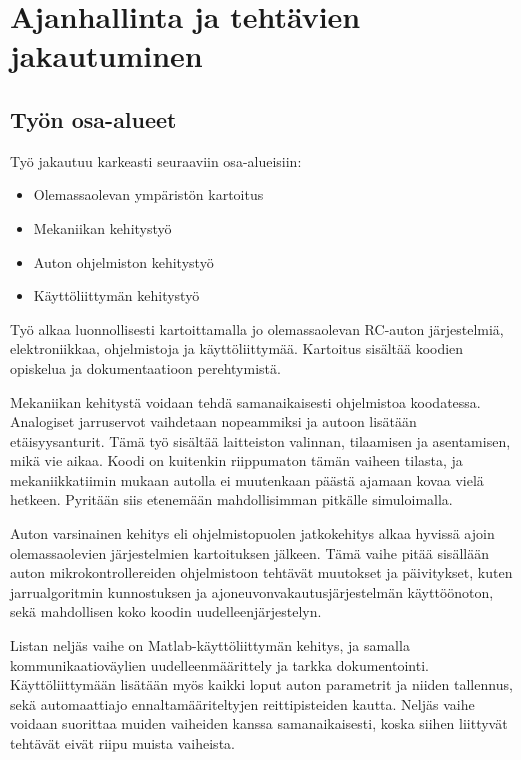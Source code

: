 \documentclass{article}
\begin{document}
\section{Ajanhallinta ja tehtävien jakautuminen}

\subsection{Työn osa-alueet}

Työ jakautuu karkeasti seuraaviin osa-alueisiin:

\begin{itemize}
	\item Olemassaolevan ympäristön kartoitus
	\item Mekaniikan kehitystyö
	\item Auton ohjelmiston kehitystyö
	\item Käyttöliittymän kehitystyö
\end{itemize}

Työ alkaa luonnollisesti kartoittamalla jo olemassaolevan RC-auton järjestelmiä, elektroniikkaa, ohjelmistoja ja käyttöliittymää. Kartoitus sisältää koodien opiskelua ja dokumentaatioon perehtymistä.

Mekaniikan kehitystä voidaan tehdä samanaikaisesti ohjelmistoa koodatessa. Analogiset jarruservot vaihdetaan nopeammiksi ja autoon lisätään etäisyysanturit. Tämä työ sisältää laitteiston valinnan, tilaamisen ja asentamisen, mikä vie aikaa. Koodi on kuitenkin riippumaton tämän vaiheen tilasta, ja mekaniikkatiimin mukaan autolla ei muutenkaan päästä ajamaan kovaa vielä hetkeen. Pyritään siis etenemään mahdollisimman pitkälle simuloimalla.

Auton varsinainen kehitys eli ohjelmistopuolen jatkokehitys alkaa hyvissä ajoin olemassaolevien järjestelmien kartoituksen jälkeen. Tämä vaihe pitää sisällään auton mikrokontrollereiden ohjelmistoon tehtävät muutokset ja päivitykset, kuten jarrualgoritmin kunnostuksen ja ajoneuvonvakautusjärjestelmän käyttöönoton, sekä mahdollisen koko koodin uudelleenjärjestelyn.

Listan neljäs vaihe on Matlab-käyttöliittymän kehitys, ja samalla kommunikaatioväylien uudelleenmäärittely ja tarkka dokumentointi. Käyttöliittymään lisätään myös kaikki loput auton parametrit ja niiden tallennus, sekä automaattiajo ennaltamääriteltyjen reittipisteiden kautta. Neljäs vaihe voidaan suorittaa muiden vaiheiden kanssa samanaikaisesti, koska siihen liittyvät tehtävät eivät riipu muista vaiheista.
\end{document}
